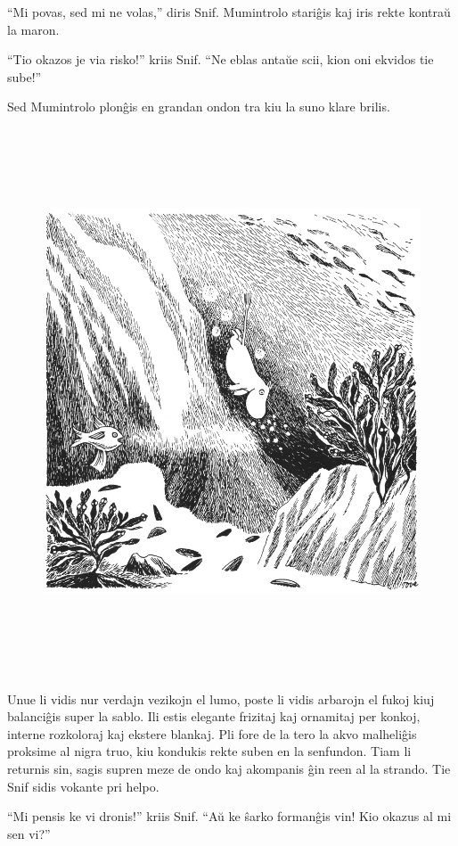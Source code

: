 ``Mi povas, sed mi ne volas,'' diris Snif. Mumintrolo stariĝis kaj iris rekte kontraŭ la maron.

``Tio okazos je via risko!'' kriis Snif. ``Ne eblas antaŭe scii, kion oni ekvidos tie sube!''

Sed Mumintrolo plonĝis en grandan ondon tra kiu la suno klare brilis.

\begin{figure}[htbp]
\centering
\includegraphics[width=450pt,height=459pt]{1-5.png}
\caption{}
\label{1-5}
\end{figure}

Unue li vidis nur verdajn vezikojn el lumo, poste li vidis arbarojn el fukoj kiuj balanciĝis super la sablo. Ili estis elegante frizitaj kaj ornamitaj per konkoj, interne rozkoloraj kaj ekstere blankaj. Pli fore de la tero la akvo malheliĝis proksime al nigra truo, kiu kondukis rekte suben en la senfundon. Tiam li returnis sin, sagis supren meze de ondo kaj akompanis ĝin reen al la strando. Tie Snif sidis vokante pri helpo.

``Mi pensis ke vi dronis!'' kriis Snif. ``Aŭ ke ŝarko formanĝis vin! Kio okazus al mi sen vi?''

